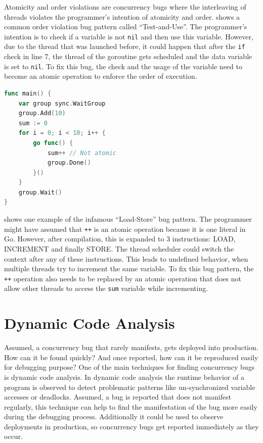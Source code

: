\documentclass[conference]{IEEEtran}
\begin{document}
Atomicity and order violations are concurrency bugs where the interleaving of threads violates the programmer's intention of atomicity and order.
 shows a common order violation bug pattern called ``Test-and-Use''.
The programmer's intention is to check if a variable is not \lstinline{nil} and then use this variable.
However, due to the thread that was launched before, it could happen that after the \lstinline{if} check in line 7, the thread of the goroutine gets scheduled and the data variable is set to \lstinline{nil}.
To fix this bug, the check and the usage of the variable need to become an atomic operation to enforce the order of execution.

\begin{lstlisting}[float=h, language=Go, label=lst:atomicity, caption=Load-Store bug pattern -- Atomicity violation]
func main() {
    var group sync.WaitGroup
    group.Add(10)
    sum := 0
    for i = 0; i < 10; i++ {
        go func() {
            sum++ // Not atomic
            group.Done()
        }()
    }
    group.Wait()
}
\end{lstlisting}

 shows one example of the infamous ``Load-Store'' bug pattern.
The programmer might have assumed that \lstinline{++} is an atomic operation because it is one literal in Go.
However, after compilation, this is expanded to 3 instructions: LOAD, INCREMENT and finally STORE.
The thread scheduler could switch the context after any of these instructions.
This leads to undefined behavior, when multiple threads try to increment the same variable.
To fix this bug pattern, the \lstinline{++} operation also needs to be replaced by an atomic operation that does not allow other threads to access the \lstinline{sum} variable while incrementing.


\section{Dynamic Code Analysis}
\label{sct:dynamic}

Assumed, a concurrency bug that rarely manifests, gets deployed into production.
How can it be found quickly?
And once reported, how can it be reproduced easily for debugging purpose?
One of the main techniques for finding concurrency bugs is dynamic code analysis.
In dynamic code analysis the runtime behavior of a program is observed to detect problematic patterns like un-synchronized variable accesses or deadlocks.
Assumed, a bug is reported that does not manifest regularly, this technique can help to find the manifestation of the bug more easily during the debugging process.
Additionally it could be used to observe deployments in production, so concurrency bugs get reported immediately as they occur.
\end{document}
